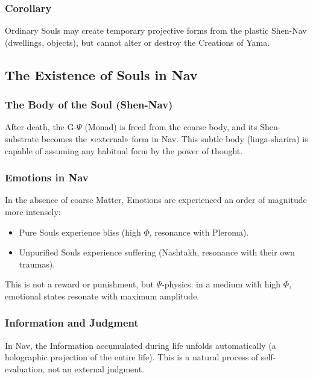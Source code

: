 \documentclass[a4paper,12pt]{article}
\begin{document}
	\subsubsection{Corollary}
	
	Ordinary Souls may create temporary projective forms from the plastic Shen-Nav (dwellings, objects), but cannot alter or destroy the Creations of Yama.
	
	\subsection{The Existence of Souls in Nav}
	
	\subsubsection{The Body of the Soul (Shen-Nav)}
	
	After death, the G-$\Psi$ (Monad) is freed from the coarse body, and its Shen-substrate becomes the «external» form in Nav. This subtle body (linga-sharira) is capable of assuming any habitual form by the power of thought.
	
	\subsubsection{Emotions in Nav}
	
	In the absence of coarse Matter, Emotions are experienced an order of magnitude more intensely:
	
	\begin{itemize}
		\item Pure Souls experience bliss (high $\Phi$, resonance with Pleroma).
		\item Unpurified Souls experience suffering (Nashtakh, resonance with their own traumas).
	\end{itemize}
	
	This is not a reward or punishment, but $\Psi$-physics: in a medium with high $\Phi$, emotional states resonate with maximum amplitude.
	
	\subsubsection{Information and Judgment}
	
	In Nav, the Information accumulated during life unfolds automatically (a holographic projection of the entire life). This is a natural process of self-evaluation, not an external judgment.
	
\end{document}
